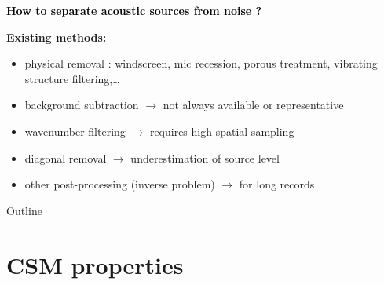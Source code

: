 \documentclass[10pt,xcolor=x11names,compress, show notes]{beamer}%
\begin{document}
\begin{frame}[t]{\insertsectionhead}
	\begin{center}
		\textcolor{black}{\bfseries \centering  How to separate acoustic sources from noise ?}
	\end{center}
	\vfill

{ \bfseries Existing methods:}
	\begin{itemize}
        		\item physical removal : windscreen, mic recession, porous treatment, vibrating structure filtering,\dots
        		\item background subtraction $\rightarrow$ not always available or representative
        		\item wavenumber filtering $\rightarrow$ requires high spatial sampling
        		\item diagonal removal $\rightarrow$ underestimation of source level
        		\item other post-processing (inverse problem) $\rightarrow$ for long records
	\end{itemize}

	\vfill
{}
\end{frame}

\begin{frame}{Outline}
	\tableofcontents[]
\end{frame}

\section{CSM properties}
\end{document}
